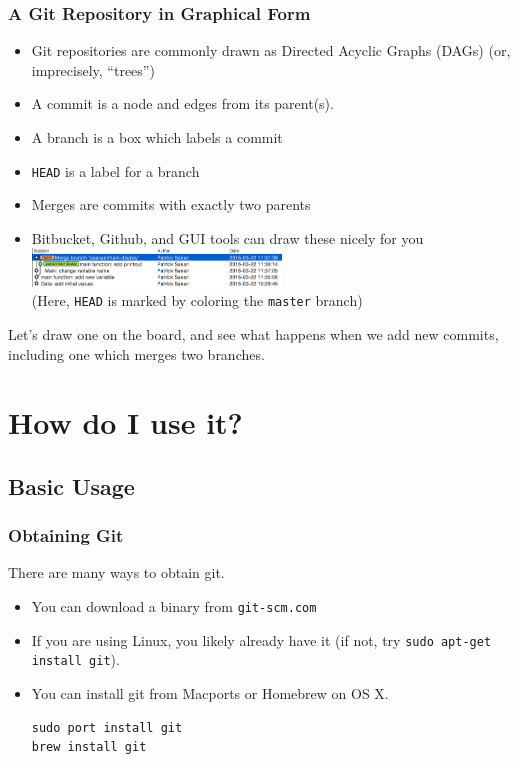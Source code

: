 \documentclass{beamer}
\begin{document}
\begin{frame}[fragile]
\frametitle{A Git Repository in Graphical Form}
\begin{itemize}
\item Git repositories are commonly drawn as Directed Acyclic Graphs (DAGs) (or, imprecisely, ``trees'')
\item A commit is a node and edges from its parent(s). 
\item A branch is a box which labels a commit
\item \texttt{HEAD} is a label for a branch
\item Merges are commits with exactly two parents
\item Bitbucket, Github, and GUI tools can draw these nicely for you
\includegraphics[width=250px]{gitx.png}\\
(Here, \texttt{HEAD} is marked by coloring the \texttt{master} branch)
\end{itemize}
Let's draw one on the board, and see what happens when we add new commits, including one which merges two branches.
\end{frame}

\section{How do I use it?}

\subsection{Basic Usage}
\begin{frame}[fragile]
\frametitle{Obtaining Git}
There are many ways to obtain git. 
\begin{itemize}
\item You can download a binary from \texttt{git-scm.com}
\item If you are using Linux, you likely already have it (if not, try \lstinline{sudo apt-get install git}).
\item You can install git from Macports or Homebrew on OS X.
\begin{lstlisting}[language=C++]
sudo port install git
brew install git
\end{lstlisting}

\end{itemize}
\end{frame}
\end{document}
